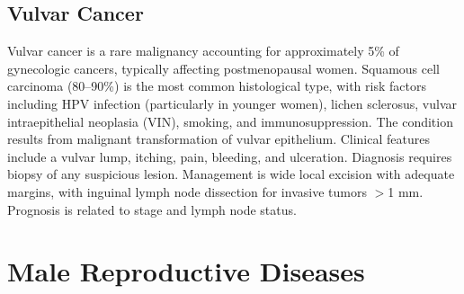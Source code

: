 \subsection{Vulvar Cancer}
\label{sec:Vulvar Cancer}
Vulvar cancer is a rare malignancy accounting for approximately 5\% of gynecologic cancers, typically affecting postmenopausal women. Squamous cell carcinoma (80--90\%) is the most common histological type, with risk factors including HPV infection (particularly in younger women), lichen sclerosus, vulvar intraepithelial neoplasia (VIN), smoking, and immunosuppression. The condition results from malignant transformation of vulvar epithelium. Clinical features include a vulvar lump, itching, pain, bleeding, and ulceration. Diagnosis requires biopsy of any suspicious lesion. Management is wide local excision with adequate margins, with inguinal lymph node dissection for invasive tumors $>$1 mm. Prognosis is related to stage and lymph node status.

\section{Male Reproductive Diseases}








\label{sec:Male Reproductive Diseases}

